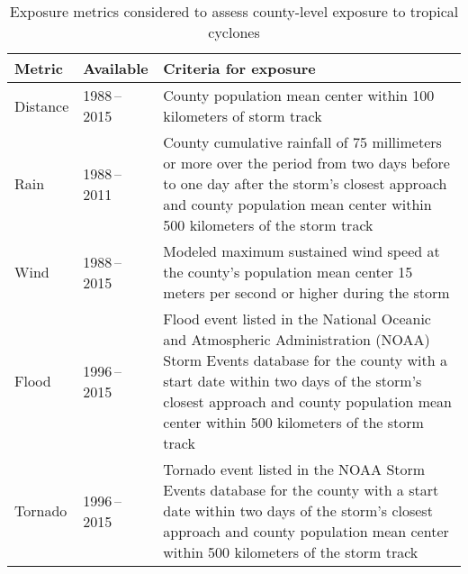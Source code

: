 \begin{table}%
\centering 
\caption{Exposure metrics considered to assess county-level exposure to 
tropical cyclones}
\begin{tabular}{p{0.9cm}p{2.5cm}p{9cm}} 
Metric & Available & Criteria for exposure \\ \midrule 
Distance & 1988\,--\,2015 & County population mean center within 100 kilometers of storm track \\ 
Rain & 1988\,--\,2011 & County cumulative rainfall of 75 millimeters or more over the period from two days before to one day after the storm's closest approach and county population mean center within 500 kilometers of the storm track \\ 
Wind & 1988\,--\,2015 & Modeled maximum sustained wind speed at the county's population mean center 15 meters per second or higher during the storm\\ 
Flood & 1996\,--\,2015 & Flood event listed in the National Oceanic and Atmospheric Administration (NOAA) Storm Events database for the county with a start date within two days of the storm's closest approach and county population mean center within 500 kilometers of the storm track \\
Tornado & 1996\,--\,2015 & Tornado event listed in the NOAA Storm Events database for the county with a start date within two days of the storm's closest approach and county population mean center within 500 kilometers of the storm track\\
\bottomrule 
\end{tabular} 
\label{tab:exposuremetrics} 
\end{table}
